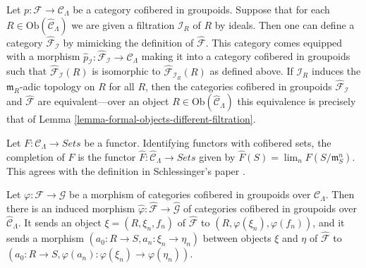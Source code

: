 \begin{remark}
\label{remark-different-sequence-ideals}
Let $p: \mathcal{F} \to \mathcal{C}_\Lambda$ be a category cofibered in 
groupoids.  Suppose that for each $R \in \text{Ob}(\widehat{\mathcal 
C}_\Lambda)$ we are given a filtration $\mathcal I_{R}$ of $R$ by ideals.  
Then one can define a category $\widehat{\mathcal{F}}_{\mathcal I}$ by mimicking 
the definition of $\widehat{\mathcal{F}}$.  This category comes equipped with a 
morphism $\widehat{p}_{\mathcal I}: \widehat{\mathcal{F}}_{\mathcal I} 
\to \mathcal{C}_\Lambda$ making it into a category cofibered in 
groupoids such that $\widehat{\mathcal{F}}_{\mathcal I}(R)$ is isomorphic to 
$\widehat{\mathcal{F}}_{\mathcal I_{R}}(R)$ as defined above. If $\mathcal 
I_{R}$ induces the $\mathfrak{m}_{R}$-adic topology on $R$ for all $R$, then 
the categories cofibered in groupoids $\widehat{\mathcal{F}}_{\mathcal I}$ and 
$\widehat{\mathcal{F}}$ are equivalent---over an object $R \in 
\text{Ob}(\widehat{\mathcal{C}}_\Lambda)$ this equivalence is precisely 
that of Lemma \ref{lemma-formal-objects-different-filtration}.
\end{remark}

\begin{remark}
\label{remark-completion-functor}
Let $F: \mathcal{C}_\Lambda \to \textit{Sets}$ be a functor.  
Identifying functors with cofibered sets, the completion of $F$ is the functor 
$\widehat{F}: \widehat{\mathcal{C}}_\Lambda \to \textit{Sets}$ 
given by $\widehat{F}(S) = \lim_{n} F(S/\mathfrak{m}_{S}^{n})$.  This agrees 
with the definition in Schlessinger's paper \cite{Sch}.
\end{remark}

\begin{remark}
\label{remark-completion-morphism}
Let $\varphi: \mathcal{F} \to \mathcal G$ be a morphism of categories 
cofibered in groupoids over $\mathcal{C}_\Lambda$.  Then there is an induced 
morphism $\widehat{\varphi}: \widehat{\mathcal{F}} \to  
\widehat{\mathcal G}$ of categories cofibered in groupoids over 
$\widehat{\mathcal{C}}_\Lambda$. It sends an object $\xi = (R, \xi_n, f_n)$ of 
$\widehat{\mathcal{F}}$ to $(R, \varphi(\xi_n), \varphi(f_n))$, and it sends a 
morphism $(a_0: R \to S, a_n: \xi_n \to \eta_n)$ between 
objects $\xi$ and $\eta$ of $\widehat{\mathcal{F}}$ to $(a_0: R \to S, 
\varphi(a_n): \varphi(\xi_n) \to \varphi(\eta_n))$.
\end{remark} 

